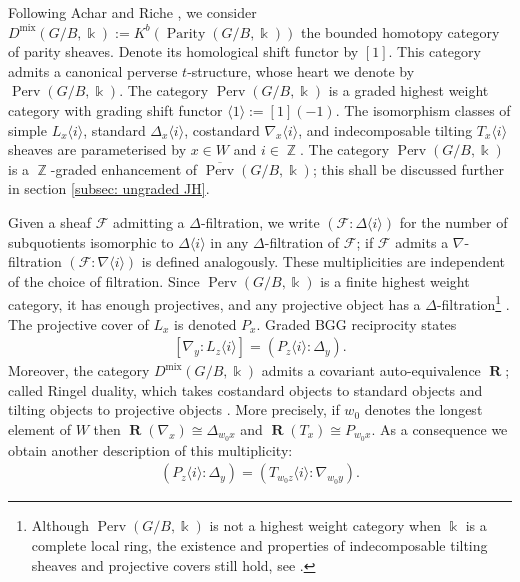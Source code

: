 \documentclass[11pt]{article}
\DeclareMathOperator{\Perv}{Perv}
\DeclareMathOperator{\mix}{mix}
\DeclareMathOperator{\Parity}{Parity}
\DeclareMathOperator{\Z}{\mathbb{Z}}
\DeclareMathOperator{\tR}{\textbf{R}}
\theoremstyle{remark}
\theoremstyle{definition}
\begin{document}
	\par 
	Following Achar and Riche \cite{AR16}, we consider $D^{\mix}(G/B, \Bbbk) := K^b(\Parity(G/B, \Bbbk))$ the bounded homotopy category of parity sheaves.
	Denote its homological shift functor by $[1]$. This category admits a canonical perverse $t$-structure, whose heart we denote by $\Perv(G/B, \Bbbk)$. 
	The category $\Perv(G/B, \Bbbk)$ is a graded highest weight category with grading shift functor $\langle 1 \rangle := [1](-1)$.	The isomorphism classes of simple $L_x \langle i \rangle$, standard $\Delta_x \langle i \rangle$, costandard $\nabla_x \langle i \rangle$, and indecomposable tilting $T_x \langle i \rangle$ sheaves are parameterised by $x \in W$ and $i \in \Z$. The category $\Perv(G/B, \Bbbk)$ is a $\Z$-graded enhancement of $\overline{\Perv}(G/B,\Bbbk)$; this shall be discussed further in section \ref{subsec: ungraded JH}.
	\\
	\par 
	Given a sheaf $\mathcal{F}$ admitting a $\Delta$-filtration, we write $(\mathcal{F}: \Delta \langle i \rangle)$ for the number of subquotients isomorphic to $\Delta \langle i \rangle$ in any $\Delta$-filtration of $\mathcal{F}$; if $\mathcal{F}$ admits a $\nabla$-filtration $(\mathcal{F}: \nabla \langle i \rangle)$ is defined analogously. 
	These multiplicities are independent of the choice of filtration.
	Since $\Perv(G/B, \Bbbk)$ is a finite highest weight category, it has enough projectives, and any projective object has a $\Delta$-filtration\footnote{
    Although $\Perv(G/B, \Bbbk)$ is not a highest weight category when $\Bbbk$ is a complete local ring, the existence and properties of indecomposable tilting sheaves and projective covers still hold, see \cite[\S3.3]{AR16}. 
    } \cite[\S A]{AR16}. 
	The projective cover of $L_x$ is denoted $P_x$.  
	Graded BGG reciprocity states
	\begin{align}
\label{Eqn: BGG}
		[\nabla_y : L_z \langle i \rangle] = (P_z \langle i \rangle : \Delta_y).
	\end{align}
	Moreover, the category $D^{\mix}(G/B, \Bbbk)$ admits a covariant auto-equivalence $\tR$; called Ringel duality, which takes costandard objects to standard objects and tilting objects to projective objects \cite[\S4]{AR16}. 
	More precisely, if $w_0$ denotes the longest element of $W$ then $\tR(\nabla_{x}) \cong \Delta_{w_0 x}$ and $\tR(T_{x}) \cong P_{w_0 x}$. 
	As a consequence we obtain another description of this multiplicity:
	\begin{align}
\label{Eqn: Ringel}
		(P_z \langle i \rangle : \Delta_y) = (T_{w_0 z} \langle i \rangle : \nabla_{w_0 y}).
	\end{align}
\end{document}
